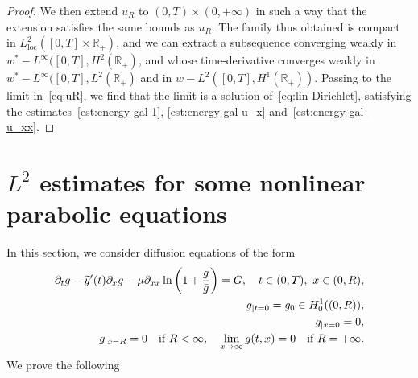 \documentclass[10pt]{amsart}
\theoremstyle{definition}\newtheorem{defi}[theo]{Definition}\newtheorem{rema}[theo]{Remark}\newtheorem{exam}[theo]{Example}\newtheorem{exem}[theo]{Example}\newtheorem{nota}[theo]{Notation}
\newcommand{\R}{\mathbb{R}}
\newcommand{\p}{\partial}
\newcommand{\rloc}{\mathrm{loc}}
\let\oldtilde\tilde
\renewcommand*{\tilde}[1]{\mathchoice{\widetilde{#1}}{\widetilde{#1}}{\oldtilde{#1}}{\oldtilde{#1}}}
\begin{document}
\begin{proof}
We then extend $u_R$ to $(0,T)\times (0, +\infty)$ in such a way that the extension satisfies the same bounds as $u_R$. The family thus obtained is compact in $L^2_\rloc([0,T]\times\R_+)$, and we can extract a subsequence converging weakly in $w^*-L^\infty([0,T], H^2(\R_+)$, and whose time-derivative converges weakly in $w^*-L^\infty([0,T], L^2(\R_+)$ and in $w-L^2([0,T], H^1(\R_+))$. Passing to the limit in~\eqref{eq:uR}, we find that the limit is a solution of~\eqref{eq:lin-Dirichlet}, satisfying the estimates~\eqref{est:energy-gal-1}, \eqref{est:energy-gal-u_x} and~\eqref{est:energy-gal-u_xx}.
\end{proof}

\section{\texorpdfstring{$L^2$}{L2} estimates for some nonlinear parabolic equations}

In this section, we consider diffusion equations of the form
\begin{equation}\label{eq:generique-g}
\begin{aligned}
\p_t g -\tilde y'(t)\p_x g-\mu \p_{xx} \ln \left(1+\frac{g}{\bar g}\right)= G,\quad t\in (0,T), \ x\in (0,R),\\
g_{|t=0}=g_0\in H^1_0((0,R)),\\
g_{|x=0}=0,\\
g_{|x=R}=0\quad \text{if }R<\infty, \quad \lim_{x\to \infty} g(t,x)=0\quad \text{if }R=+\infty.
\end{aligned}
\end{equation}
We prove the following
\end{document}
